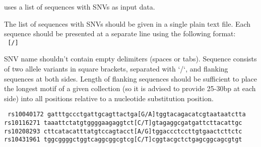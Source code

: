  uses a list of sequences with SNVs as input data.

The list of sequences with SNVs should be given in a single plain text file. 
Each sequence should be presented at a separate line using the following format:\\
\texttt{ [/]}

SNV name shouldn't contain empty delimiters (spaces or tabs). 
Sequence consists of two allele variants in square brackets, separated with `/`, and flanking sequences at both sides. Length of flanking sequences should be sufficient to place the longest motif of a given collection (so it is advised to provide 25-30bp at each side) into all positions relative to a nucleotide substitution position. 

\noindent\texttt{%
rs10040172 gatttgccctgattgcagttactga[G/A]tggtacagacatcgtaataatctta
rs10116271 taaattctatgtggggaagaggtct[C/T]gtagaggcgatgattcttacattgc
rs10208293 cttcatacatttatgtccagtacct[A/G]tggaccctccttgtgaactcttctc
rs10431961 tggcggggctggtcaggcggcgtcg[C/T]cggtacgctctgagcggcagcgtgt
}

